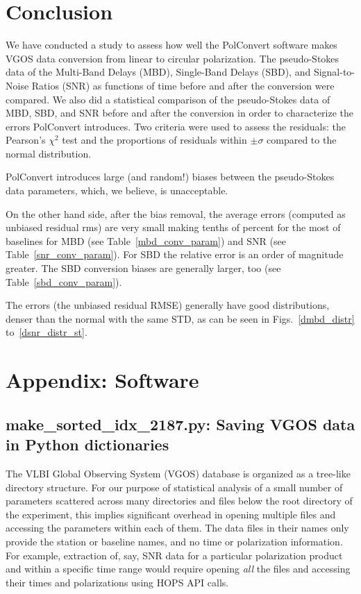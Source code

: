 \documentclass[letterpaper,twoside,12pt]{article}
\begin{document}
\section{Conclusion}

We have conducted a study to assess how well the PolConvert software makes VGOS data conversion from linear to circular polarization. The pseudo-Stokes data of the Multi-Band Delays (MBD), Single-Band Delays (SBD), and Signal-to-Noise Ratios (SNR) as functions of time before and after the conversion were compared. We also did a statistical comparison of the pseudo-Stokes data of MBD, SBD, and SNR before and after the conversion in order to characterize the errors PolConvert introduces. Two criteria were used to assess the residuals: the Pearson's $\chi^2$ test and the proportions of residuals within $\pm\sigma$ compared to the normal distribution. 

PolConvert introduces large (and random!) biases between the pseudo-Stokes data parameters, which, we believe, is unacceptable. 

On the other hand side, after the bias removal, the average errors (computed as unbiased residual rms) are very small making tenths of percent for the most of baselines for MBD (see Table~\ref{mbd_conv_param}) and SNR (see Table~\ref{snr_conv_param}). For SBD the relative error is an order of magnitude greater. The SBD conversion biases are generally larger, too (see Table~\ref{sbd_conv_param}).

The errors (the unbiased residual RMSE) generally have good distributions, denser than the normal with the same STD, as can be seen in Figs.~\ref{dmbd_distr} to~\ref{dsnr_distr_st}.

\cleardoublepage

\section{Appendix: Software}

\subsection{make\_sorted\_idx\_2187.py: Saving VGOS data in Python dictionaries}

The VLBI Global Observing System (VGOS) database is organized as a tree-like directory structure. For our purpose of statistical analysis of a small number of parameters scattered across many directories and files below the root directory of the experiment, this implies significant overhead in opening multiple files and accessing the parameters within each of them. The data files in their names only provide the station or baseline names, and no time or polarization information. For example, extraction of, say, SNR data for a particular polarization product and within a specific time range would require opening \emph{all} the files and accessing their times and polarizations using HOPS API calls.
\end{document}
